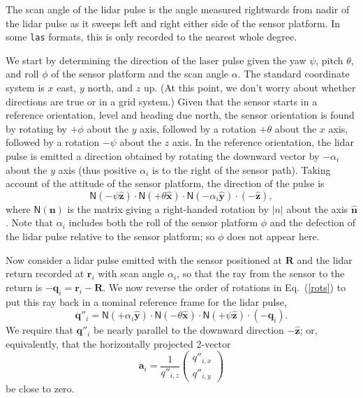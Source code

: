 \documentclass
[rmp,reprint,
twocolumn,amsmath,showkeys,letterpaper,raggedbottom]{revtex4-2}
\begin{document}
The scan angle of the lidar pulse is the angle measured rightwards from
nadir of the lidar pulse as it sweeps left and right either side of the
sensor platform.  In some {\tt las} formats, this is only recorded
to the nearest whole degree.

We start by determining the direction of the laser pulse given the yaw
$\psi$, pitch $\theta$, and roll $\phi$ of the sensor platform and the
scan angle $\alpha$.  The standard coordinate system is $x$ east, $y$
north, and $z$ up.  (At this point, we don't worry about whether
directions are true or in a grid system.)  Given that the sensor starts
in a reference orientation, level and heading due north, the sensor
orientation is found by rotating by $+\phi$ about the $y$ axis, followed
by a rotation $+\theta$ about the $x$ axis, followed by a rotation
$-\psi$ about the $z$ axis.  In the reference orientation, the lidar
pulse is emitted a direction obtained by rotating the downward vector by
$-\alpha_i$ about the $y$ axis (thus positive $\alpha_i$ is to the right
of the sensor path).  Taking account of the attitude of the sensor
platform, the direction of the pulse is
\begin{equation}\label{rots}
\mathsf N(-\psi \hat{\mathbf z}) \cdot
\mathsf N(+\theta \hat{\mathbf x}) \cdot
\mathsf N(-\alpha_i \hat{\mathbf y}) \cdot (-\hat{\mathbf z}),
\end{equation}
where $\mathsf N(\mathbf n)$ is the matrix giving a right-handed
rotation by $\left| n \right |$ about the axis $\hat{\mathbf n}$.  Note
that $\alpha_i$ includes both the roll of the sensor platform $\phi$ and
the defection of the lidar pulse relative to the sensor platform; so
$\phi$ does not appear here.

Now consider a lidar pulse emitted with the sensor positioned at
$\mathbf R$ and the lidar return recorded at $\mathbf r_i$ with scan
angle $\alpha_i$, so that the ray from the sensor to the return is
$-\mathbf q_i = \mathbf r_i - \mathbf R$.  We now reverse the
order of rotations in Eq.~(\ref{rots}) to put this ray back in a nominal
reference frame for the lidar pulse,
\begin{equation}
  \mathbf q''_i =
  \mathsf N(+\alpha_i \hat{\mathbf y}) \cdot
  \mathsf N(-\theta \hat{\mathbf x}) \cdot
  \mathsf N(+\psi \hat{\mathbf z}) \cdot (-\mathbf q_i).
\end{equation}
We require that $\mathbf q''_i$ be nearly parallel to the downward
direction $-\hat{\mathbf z}$; or, equivalently, that the horizontally
projected 2-vector
\begin{equation}
  \mathbf a_i = \frac1{q''_{i,z}}
  \begin{pmatrix}
    q''_{i,x}\\[1ex]
    q''_{i,y}
  \end{pmatrix}
\end{equation}
be close to zero.
\end{document}
